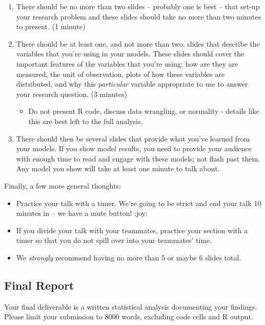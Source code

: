 \documentclass[
]{article}
\providecommand{\tightlist}{%
  \setlength{\itemsep}{0pt}\setlength{\parskip}{0pt}}
\begin{document}
\begin{enumerate}
\def\labelenumi{\arabic{enumi}.}
\tightlist
\item
  There should be no more than two slides -- probably one is best --
  that set-up your research problem and these slides should take no more
  than two minutes to present. (1 minute)
\item
  There should be at least one, and not more than two, slides that
  describe the variables that you're using in your models. These slides
  should cover the important features of the variables that you're
  using: how are they are measured, the unit of observation, plots of
  how these variables are distributed, and why this \emph{particular}
  variable appropriate to use to answer your research question. (3
  minutes)

  \begin{itemize}
  \tightlist
  \item
    Do not present R code, discuss data wrangling, or normality -
    details like this are best left to the full analysis.
  \end{itemize}
\item
  There should then be several slides that provide what you've learned
  from your models. If you show model results, you need to provide your
  audience with enough time to read and engage with these models; not
  flash past them. Any model you show will take at least one minute to
  talk about.
\end{enumerate}

Finally, a few more general thoughts:

\begin{itemize}
\tightlist
\item
  Practice your talk with a timer. We're going to be strict and end your
  talk 10 minutes in -- we have a mute button! :joy:
\item
  If you divide your talk with your teammates, practice your section
  with a timer so that you do not spill over into your teammates' time.
\item
  We \emph{strongly} recommend having no more than 5 or maybe 6 slides
  total.
\end{itemize}

\hypertarget{final-report}{%
\subsection{Final Report}\label{final-report}}

Your final deliverable is a written statistical analysis documenting
your findings. Please limit your submission to 8000 words, excluding
code cells and R output.
\end{document}

